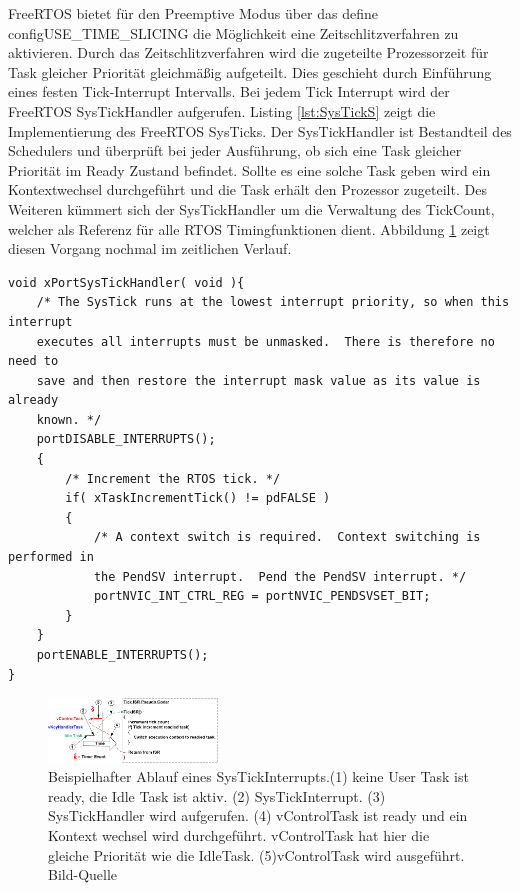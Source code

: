 \newline
FreeRTOS bietet für den Preemptive Modus über das define configUSE\_TIME\_SLICING die Möglichkeit eine Zeitschlitzverfahren zu aktivieren. Durch das Zeitschlitzverfahren wird die zugeteilte Prozessorzeit für Task gleicher Priorität gleichmäßig aufgeteilt. Dies geschieht durch Ein\-füh\-rung eines festen Tick-Interrupt Intervalls. Bei jedem Tick Interrupt wird der FreeRTOS SysTickHandler aufgerufen. Listing \ref{lst:SysTickS} zeigt die Implementierung des FreeRTOS SysTicks. Der SysTickHandler ist Bestandteil des Schedulers und überprüft bei jeder Ausführung, ob sich eine Task gleicher Priorität im Ready Zustand befindet. Sollte es eine solche Task geben wird ein Kontextwechsel durchgeführt und die Task erhält den Prozessor zugeteilt. Des Weiteren kümmert sich der SysTickHandler um die Verwaltung des TickCount, welcher als Referenz für alle RTOS Timingfunktionen dient. Abbildung \ref{fig:SysTick} zeigt diesen Vorgang nochmal im zeitlichen Verlauf. 
\begin{lstlisting}[caption={FreeRTOS Source des SysTickHandlers aus Task.c. Der SysTickHandler verwaltet den TickCount. Der TickCount dient allen Timingfunktionen des RTOS Kernels als Zeitreferenz. Des Weiteren wird bei aktivem Time Slicing überprüft ob ein Kontextwechsel nötig ist. Der Kontext wechsel wir dann ggf. durch den PendSVHandler durchgeführt.}, linewidth=8cm,captionpos=b, label=lst:SysTickS, float=hbt]
void xPortSysTickHandler( void ){
	/* The SysTick runs at the lowest interrupt priority, so when this interrupt
	executes all interrupts must be unmasked.  There is therefore no need to
	save and then restore the interrupt mask value as its value is already
	known. */
	portDISABLE_INTERRUPTS();
	{
		/* Increment the RTOS tick. */
		if( xTaskIncrementTick() != pdFALSE )
		{
			/* A context switch is required.  Context switching is performed in
			the PendSV interrupt.  Pend the PendSV interrupt. */
			portNVIC_INT_CTRL_REG = portNVIC_PENDSVSET_BIT;
		}
	}
	portENABLE_INTERRUPTS();
}
\end{lstlisting}
\begin{figure}[htb]
	\centering
		\includegraphics[width=0.4\textwidth]{Pictures/FreeRTOSOrg/TickISR.png}
	\caption{Beispielhafter Ablauf eines SysTickInterrupts.(1) keine User Task ist ready, die Idle Task ist aktiv. (2) SysTickInterrupt. (3) SysTickHandler wird aufgerufen. (4) vControlTask ist ready und ein Kontext wechsel wird durchgeführt. vControlTask hat hier die gleiche Priorität wie die IdleTask. (5)vControlTask wird ausgeführt. Bild-Quelle~\protect{}}
	\label{fig:SysTick}
\end{figure}
